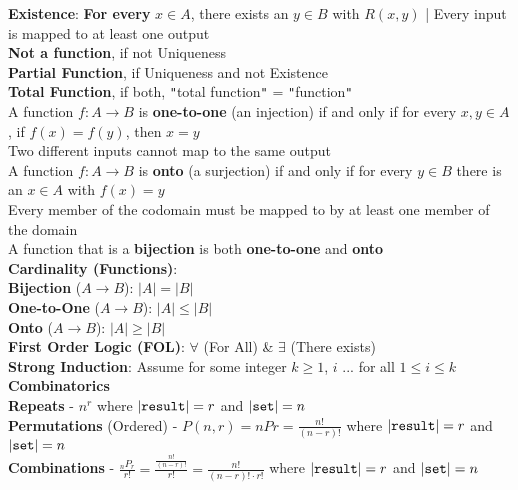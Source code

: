\documentclass{article}
\begin{document}
	\indent{}\textbf{Existence}: \textbf{For every} $x \in A$, there exists an $y \in B$ with $R(x,y)$ | Every input is mapped to at least one output \\
	\indent{}\textbf{Not a function}, if not Uniqueness \\
	\indent{}\textbf{Partial Function}, if Uniqueness and not Existence \\
	\indent{}\textbf{Total Function}, if both, \verb|"|total function\verb|"| = \verb|"|function\verb|"| \\
	\indent{}A function $f \colon A \rightarrow B$ is \textbf{one-to-one} (an injection) if and only if for every $x,y \in A$, if $f(x) = f(y)$, then $x=y$ \\
		\indent{\hspace{\parindent}}Two different inputs cannot map to the same output \\
	\indent{}A function $f \colon A \rightarrow B$ is \textbf{onto} (a surjection) if and only if for every $y \in B$ there is an $x \in A$ with $f(x) = y$ \\
		\indent{\hspace{\parindent}}Every member of the codomain must be mapped to by at least one member of the domain \\
	\indent{}A function that is a \textbf{bijection} is both \textbf{one-to-one} and \textbf{onto} \\
\textbf{Cardinality (Functions)}: \\
	\indent{}\textbf{Bijection} ($A \rightarrow B$): $|A| = |B|$ \\
	\indent{}\textbf{One-to-One} ($A \rightarrow B$): $|A| \leq |B|$ \\
	\indent{}\textbf{Onto} ($A \rightarrow B$): $|A| \geq |B|$ \\
\textbf{First Order Logic (FOL)}: $\forall$ (For All) \& $\exists$ (There exists) \\
\textbf{Strong Induction}: Assume for some integer $k \geq 1$, $i$ ... for all $1 \leq i \leq k$ \\
\textbf{Combinatorics} \\
	\indent{}\textbf{Repeats} - $n^r$ where $|\verb|result|| = r$ and $|\verb|set|| = n$ \\
	\indent{}\textbf{Permutations} (Ordered) - $P(n,r) = nPr = \frac{n!}{(n-r)!}$ where $|\verb|result|| = r$ and $|\verb|set|| = n$ \\
	\indent{}\textbf{Combinations} - $\frac{_nP_r}{r!} = \frac{\frac{n!}{(n-r)!}}{r!} = \frac{n!}{(n-r)! \cdot r!}$ where $|\verb|result|| = r$ and $|\verb|set|| = n$ \\
\end{document}
